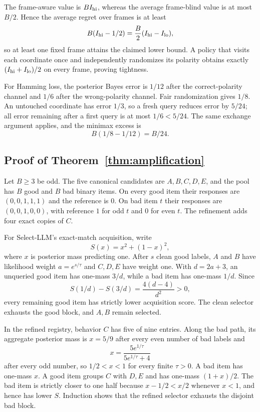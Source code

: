 The frame-aware value is $BI_{\rm hi}$, whereas the average frame-blind value is at most $B/2$. Hence the average regret over frames is at least
\[
B(I_{\rm hi}-1/2)=\frac{B}{2}(I_{\rm hi}-I_{\rm lo}),
\]
so at least one fixed frame attains the claimed lower bound. A policy that visits each coordinate once and independently randomizes its polarity obtains exactly $(I_{\rm hi}+I_{\rm lo})/2$ on every frame, proving tightness.

For Hamming loss, the posterior Bayes error is $1/12$ after the correct-polarity channel and $1/6$ after the wrong-polarity channel. Fair randomization gives $1/8$. An untouched coordinate has error $1/3$, so a fresh query reduces error by $5/24$; all error remaining after a first query is at most $1/6<5/24$. The same exchange argument applies, and the minimax excess is
\[
B(1/8-1/12)=B/24.
\]

\subsection{Proof of Theorem~\ref{thm:amplification}}

Let $B\geq3$ be odd. The five canonical candidates are $A,B,C,D,E$, and the pool has $B$ good and $B$ bad binary items. On every good item their responses are $(0,0,1,1,1)$ and the reference is $0$. On bad item $t$ their responses are $(0,0,1,0,0)$, with reference $1$ for odd $t$ and $0$ for even $t$. The refinement adds four exact copies of $C$.

For Select-LLM's exact-match acquisition, write
\[
S(x)=x^2+(1-x)^2,
\]
where $x$ is posterior mass predicting one. After $s$ clean good labels, $A$ and $B$ have likelihood weight $a=e^{s/\tau}$ and $C,D,E$ have weight one. With $d=2a+3$, an unqueried good item has one-mass $3/d$, while a bad item has one-mass $1/d$. Since
\[
S(1/d)-S(3/d)=\frac{4(d-4)}{d^2}>0,
\]
every remaining good item has strictly lower acquisition score. The clean selector exhausts the good block, and $A,B$ remain selected.

In the refined registry, behavior $C$ has five of nine entries. Along the bad path, its aggregate posterior mass is $x=5/9$ after every even number of bad labels and
\[
x=\frac{5e^{1/\tau}}{5e^{1/\tau}+4}
\]
after every odd number, so $1/2<x<1$ for every finite $\tau>0$. A bad item has one-mass $x$. A good item groups $C$ with $D,E$ and has one-mass $(1+x)/2$. The bad item is strictly closer to one half because $x-1/2<x/2$ whenever $x<1$, and hence has lower $S$. Induction shows that the refined selector exhausts the disjoint bad block.

